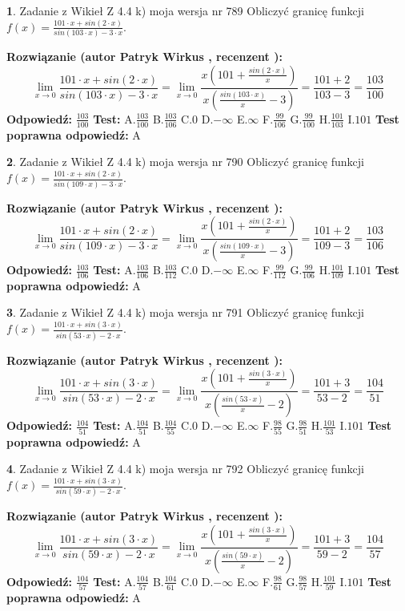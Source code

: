 \documentclass[12pt, a4paper]{article}
\theoremstyle{definition} %
\newtheorem{zad}{}
\newcommand{\zadStart}[1]{\begin{zad}#1\newline}
\newcommand{\zadStop}{\end{zad}}
\newcommand{\rozwStart}[2]{\noindent \textbf{Rozwiązanie (autor #1 , recenzent #2): }\newline}
\newcommand{\rozwStop}{\newline}
\newcommand{\odpStart}{\noindent \textbf{Odpowiedź:}\newline}
\newcommand{\odpStop}{\newline}
\newcommand{\testStart}{\noindent \textbf{Test:}\newline}
\newcommand{\testStop}{\newline}
\newcommand{\kluczStart}{\noindent \textbf{Test poprawna odpowiedź:}\newline}
\newcommand{\kluczStop}{\newline}
\begin{document}
\zadStart{Zadanie z Wikieł Z 4.4 k) moja wersja nr 789}
Obliczyć granicę funkcji $f(x)=\frac{101\cdot x +sin(2\cdot x)}{sin(103\cdot x) -3\cdot x}$.
\zadStop
\rozwStart{Patryk Wirkus}{}
$$\lim\limits_{x\to 0}\frac{101\cdot x +sin(2\cdot x)}{sin(103\cdot x) -3\cdot x}
=\lim\limits_{x\to 0}\frac{x(101+\frac{sin(2\cdot x)}{x})}{x(\frac{sin(103\cdot x)}{x}-3)}
=\frac{101+2}{103-3} = \frac{103}{100}$$
\rozwStop
\odpStart
$\frac{103}{100}$
\odpStop
\testStart
A.$\frac{103}{100}$
B.$\frac{103}{106}$
C.$0$
D.$-\infty$
E.$\infty$
F.$\frac{99}{106}$
G.$\frac{99}{100}$
H.$\frac{101}{103}$
I.$101$
\testStop
\kluczStart
A
\kluczStop



\zadStart{Zadanie z Wikieł Z 4.4 k) moja wersja nr 790}
Obliczyć granicę funkcji $f(x)=\frac{101\cdot x +sin(2\cdot x)}{sin(109\cdot x) -3\cdot x}$.
\zadStop
\rozwStart{Patryk Wirkus}{}
$$\lim\limits_{x\to 0}\frac{101\cdot x +sin(2\cdot x)}{sin(109\cdot x) -3\cdot x}
=\lim\limits_{x\to 0}\frac{x(101+\frac{sin(2\cdot x)}{x})}{x(\frac{sin(109\cdot x)}{x}-3)}
=\frac{101+2}{109-3} = \frac{103}{106}$$
\rozwStop
\odpStart
$\frac{103}{106}$
\odpStop
\testStart
A.$\frac{103}{106}$
B.$\frac{103}{112}$
C.$0$
D.$-\infty$
E.$\infty$
F.$\frac{99}{112}$
G.$\frac{99}{106}$
H.$\frac{101}{109}$
I.$101$
\testStop
\kluczStart
A
\kluczStop



\zadStart{Zadanie z Wikieł Z 4.4 k) moja wersja nr 791}
Obliczyć granicę funkcji $f(x)=\frac{101\cdot x +sin(3\cdot x)}{sin(53\cdot x) -2\cdot x}$.
\zadStop
\rozwStart{Patryk Wirkus}{}
$$\lim\limits_{x\to 0}\frac{101\cdot x +sin(3\cdot x)}{sin(53\cdot x) -2\cdot x}
=\lim\limits_{x\to 0}\frac{x(101+\frac{sin(3\cdot x)}{x})}{x(\frac{sin(53\cdot x)}{x}-2)}
=\frac{101+3}{53-2} = \frac{104}{51}$$
\rozwStop
\odpStart
$\frac{104}{51}$
\odpStop
\testStart
A.$\frac{104}{51}$
B.$\frac{104}{55}$
C.$0$
D.$-\infty$
E.$\infty$
F.$\frac{98}{55}$
G.$\frac{98}{51}$
H.$\frac{101}{53}$
I.$101$
\testStop
\kluczStart
A
\kluczStop



\zadStart{Zadanie z Wikieł Z 4.4 k) moja wersja nr 792}
Obliczyć granicę funkcji $f(x)=\frac{101\cdot x +sin(3\cdot x)}{sin(59\cdot x) -2\cdot x}$.
\zadStop
\rozwStart{Patryk Wirkus}{}
$$\lim\limits_{x\to 0}\frac{101\cdot x +sin(3\cdot x)}{sin(59\cdot x) -2\cdot x}
=\lim\limits_{x\to 0}\frac{x(101+\frac{sin(3\cdot x)}{x})}{x(\frac{sin(59\cdot x)}{x}-2)}
=\frac{101+3}{59-2} = \frac{104}{57}$$
\rozwStop
\odpStart
$\frac{104}{57}$
\odpStop
\testStart
A.$\frac{104}{57}$
B.$\frac{104}{61}$
C.$0$
D.$-\infty$
E.$\infty$
F.$\frac{98}{61}$
G.$\frac{98}{57}$
H.$\frac{101}{59}$
I.$101$
\testStop
\kluczStart
A
\kluczStop
\end{document}
